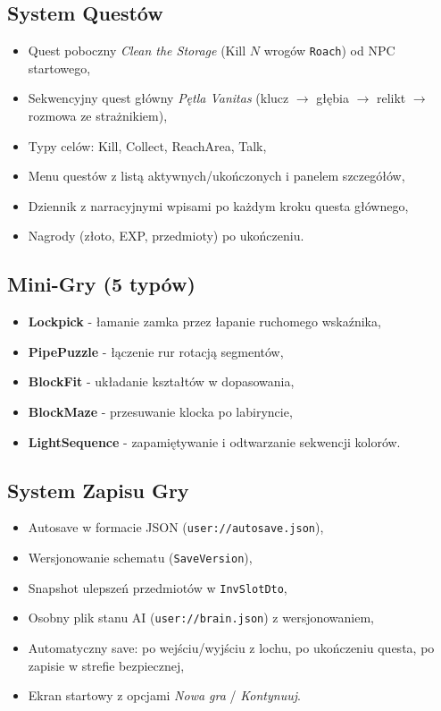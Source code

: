 \subsection{System Questów}
\begin{itemize}
    \item Quest poboczny \textit{Clean the Storage} (Kill $N$ wrogów \texttt{Roach}) od NPC startowego,
    \item Sekwencyjny quest główny \textit{Pętla Vanitas} (klucz $\rightarrow$ głębia $\rightarrow$ relikt $\rightarrow$ rozmowa ze strażnikiem),
    \item Typy celów: Kill, Collect, ReachArea, Talk,
    \item Menu questów z listą aktywnych/ukończonych i panelem szczegółów,
    \item Dziennik z narracyjnymi wpisami po każdym kroku questa głównego,
    \item Nagrody (złoto, EXP, przedmioty) po ukończeniu.
\end{itemize}

\subsection{Mini-Gry (5 typów)}
\begin{itemize}
    \item \textbf{Lockpick} - łamanie zamka przez łapanie ruchomego wskaźnika,
    \item \textbf{PipePuzzle} - łączenie rur rotacją segmentów,
    \item \textbf{BlockFit} - układanie kształtów w dopasowania,
    \item \textbf{BlockMaze} - przesuwanie klocka po labiryncie,
    \item \textbf{LightSequence} - zapamiętywanie i odtwarzanie sekwencji kolorów.
\end{itemize}

\subsection{System Zapisu Gry}
\begin{itemize}
    \item Autosave w formacie JSON (\texttt{user://autosave.json}),
    \item Wersjonowanie schematu (\texttt{SaveVersion}),
    \item Snapshot ulepszeń przedmiotów w \texttt{InvSlotDto},
    \item Osobny plik stanu AI (\texttt{user://brain.json}) z wersjonowaniem,
    \item Automatyczny save: po wejściu/wyjściu z lochu, po ukończeniu questa, po zapisie w strefie bezpiecznej,
    \item Ekran startowy z opcjami \textit{Nowa gra} / \textit{Kontynuuj}.
\end{itemize}

